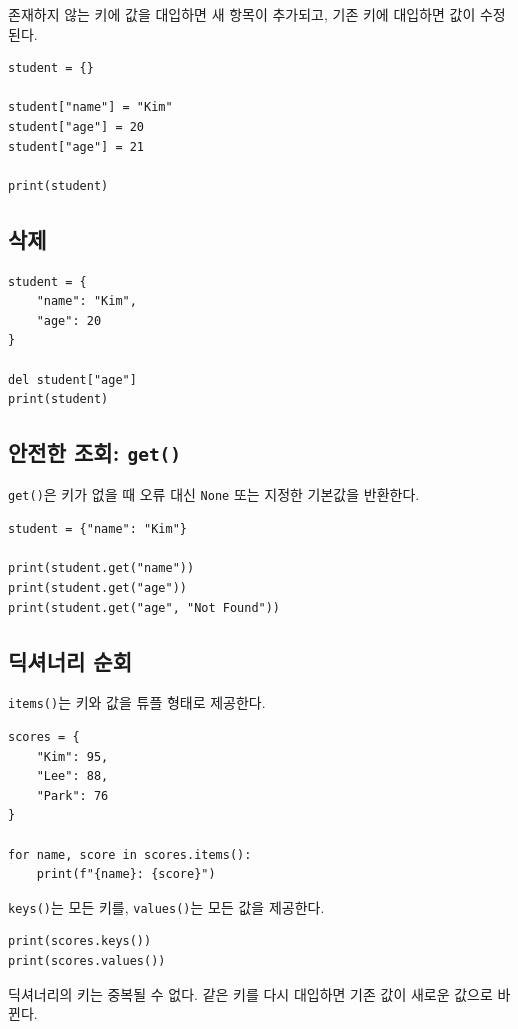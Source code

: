 \documentclass[11pt,a4paper]{article}
\begin{document}
존재하지 않는 키에 값을 대입하면 새 항목이 추가되고, 기존 키에 대입하면 값이 수정된다.

\begin{lstlisting}
student = {}

student["name"] = "Kim"
student["age"] = 20
student["age"] = 21

print(student)
\end{lstlisting}

\subsection{삭제}

\begin{lstlisting}
student = {
    "name": "Kim",
    "age": 20
}

del student["age"]
print(student)
\end{lstlisting}

\subsection{안전한 조회: \texttt{get()}}

\texttt{get()}은 키가 없을 때 오류 대신 \texttt{None} 또는 지정한 기본값을 반환한다.

\begin{lstlisting}
student = {"name": "Kim"}

print(student.get("name"))
print(student.get("age"))
print(student.get("age", "Not Found"))
\end{lstlisting}

\subsection{딕셔너리 순회}

\texttt{items()}는 키와 값을 튜플 형태로 제공한다.

\begin{lstlisting}
scores = {
    "Kim": 95,
    "Lee": 88,
    "Park": 76
}

for name, score in scores.items():
    print(f"{name}: {score}")
\end{lstlisting}

\texttt{keys()}는 모든 키를, \texttt{values()}는 모든 값을 제공한다.

\begin{lstlisting}
print(scores.keys())
print(scores.values())
\end{lstlisting}

\begin{importantbox}
딕셔너리의 키는 중복될 수 없다. 같은 키를 다시 대입하면 기존 값이 새로운 값으로 바뀐다.
\end{importantbox}
\end{document}
